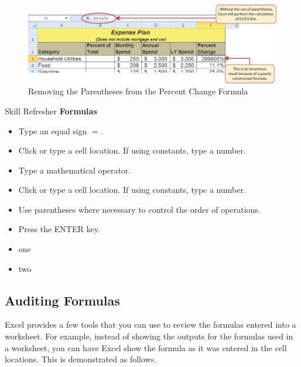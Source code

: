 \begin{figure}[H]
	\centering
	\includegraphics[width=\maxwidth{.95\linewidth}]{gfx/ch02_fig07}
	\caption{Removing the Parentheses from the Percent Change Formula}
	\label{02:fig07}
\end{figure}

\begin{center}
	\begin{sklbox}{Skill Refresher}
		\textbf{Formulas}
		\\
		\begin{itemize}
			\setlength{\itemsep}{0pt}
			\setlength{\parskip}{0pt}
			\setlength{\parsep}{0pt}
			
			\item Type an equal sign $ = $.
			\item Click or type a cell location. If using constants, type a number.
			\item Type a mathematical operator.
			\item Click or type a cell location. If using constants, type a number.
			\item Use parentheses where necessary to control the order of operations.
			\item Press the ENTER key.

			\item one
			\item two
			
		\end{itemize}
	\end{sklbox}
\end{center}

\subsection{Auditing Formulas}

Excel provides a few tools that you can use to review the formulas entered into a worksheet. For example, instead of showing the outputs for the formulas used in a worksheet, you can have Excel show the formula as it was entered in the cell locations. This is demonstrated as follows.

